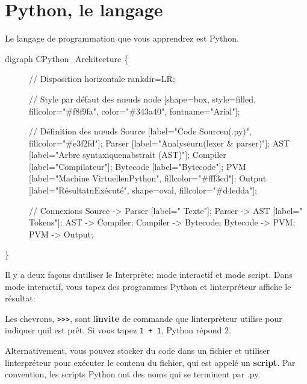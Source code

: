 \hypertarget{python-le-langage}{%
\section{Python, le langage}\label{python-le-langage}}

Le langage de programmation que vous apprendrez est Python.

\begin{description}
\item[digraph CPython\_Architecture \{]
// Disposition horizontale rankdir=LR;

// Style par défaut des nœuds node {[}shape=box, style=filled,
fillcolor="\#f8f9fa", color="\#343a40", fontname="Arial"{]};

// Définition des nœuds Source {[}label="Code Sourcen(.py)",
fillcolor="\#e3f2fd"{]}; Parser {[}label="Analyseurn(lexer \&
parser)"{]}; AST {[}label="Arbre syntaxiquenabstrait (AST)"{]}; Compiler
{[}label="Compilateur"{]}; Bytecode {[}label="Bytecode"{]}; PVM
{[}label="Machine VirtuellenPython", fillcolor="\#fff3cd"{]}; Output
{[}label="RésultatnExécuté", shape=oval, fillcolor="\#d4edda"{]};

// Connexions Source -\textgreater{} Parser {[}label=" Texte"{]}; Parser
-\textgreater{} AST {[}label=" Tokens"{]}; AST -\textgreater{} Compiler;
Compiler -\textgreater{} Bytecode; Bytecode -\textgreater{} PVM; PVM
-\textgreater{} Output;
\end{description}

\}

Il y a deux façons d\textquotesingle utiliser le Interprète: mode
interactif et mode script. Dans mode interactif, vous tapez des
programmes Python et l\textquotesingle interpréteur affiche le résultat:

\begin{Shaded}
\begin{Highlighting}[]
\OperatorTok{\textgreater{}\textgreater{}\textgreater{}}  \OperatorTok{+} 
\end{Highlighting}
\end{Shaded}

Les chevrons, \texttt{\textgreater{}\textgreater{}\textgreater{}}, sont
l\textquotesingle{}\textbf{invite} de commande que
l\textquotesingle interprèteur utilise pour indiquer
qu\textquotesingle il est prêt. Si vous tapez \texttt{1\ +\ 1}, Python
répond 2.

Alternativement, vous pouvez stocker du code dans un fichier et utiliser
l\textquotesingle interpréteur pour exécuter le contenu du fichier, qui
est appelé un \textbf{script}. Par convention, les scripts Python ont
des noms qui se terminent par {.py}.

